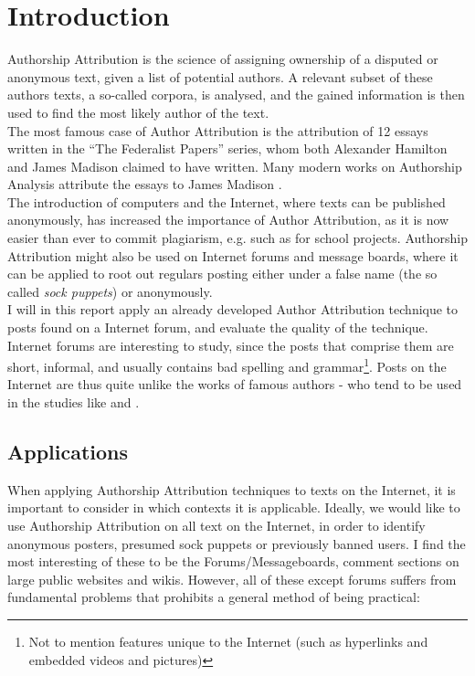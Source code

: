 \section{Introduction}
\label{introduction}
Authorship Attribution is the science of assigning ownership of a disputed or anonymous text, given a list of potential authors. A relevant subset of these authors texts, a so-called corpora, is analysed, and the gained information is then used to find the most likely author of the text.\\

The most famous case of Author Attribution is the attribution of 12 essays written in the ``The Federalist Papers'' series, whom both Alexander Hamilton and James Madison claimed to have written. Many modern works on Authorship Analysis attribute the essays to James Madison \cite{Fung03thedisputed}.\\
 The introduction of computers and the Internet, where texts can be published anonymously, has increased the importance of Author Attribution, as it is now easier than ever to commit plagiarism, e.g. such as for school projects. Authorship Attribution might also be used on Internet forums and message boards, where it can be applied to root out regulars posting either under a false name (the so called \emph{sock puppets}) or anonymously.\\ 

I will in this report apply an already developed Author Attribution technique to posts found on a Internet forum, and evaluate the quality of the technique.\\

Internet forums are interesting to study, since the posts that comprise them are short, informal, and usually contains bad spelling and grammar\footnote{Not to mention features unique to the Internet (such as hyperlinks and embedded videos and pictures)}. Posts on the Internet are thus quite unlike the works of famous authors - who tend to be used in the studies like \cite{nr4} and \cite{nr2}.  

\subsection{Applications}
When applying Authorship Attribution techniques to texts on the Internet, it is important to consider in which contexts it is applicable. Ideally, we would like to use Authorship Attribution on all text on the Internet, in order to identify anonymous posters, presumed sock puppets or previously banned users. I find the most interesting of these to be the Forums/Messageboards, comment sections on large public websites and wikis. However, all of these except forums suffers from fundamental problems that prohibits a general method of being practical:

